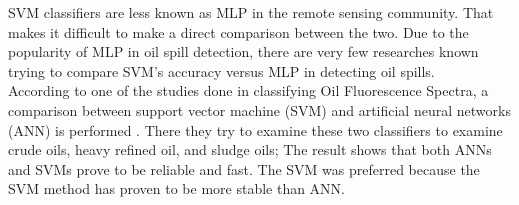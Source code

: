 



 
SVM classifiers are less known as MLP in the remote sensing community. That makes it difficult to make a direct comparison between the two. Due to the popularity of MLP in oil spill detection, there are very few researches known trying to compare SVM's accuracy versus MLP in detecting oil spills.\\ 

According to one of the studies done in classifying Oil Fluorescence Spectra, a comparison between support vector machine (SVM) and artificial neural networks (ANN) is performed \cite{almhdi2007classification}. There they try to examine these two classifiers to examine crude oils, heavy refined oil, and sludge oils; The result shows that both ANNs and SVMs prove to be reliable and fast. The SVM was preferred because the SVM method has proven to be more stable than ANN.\\


